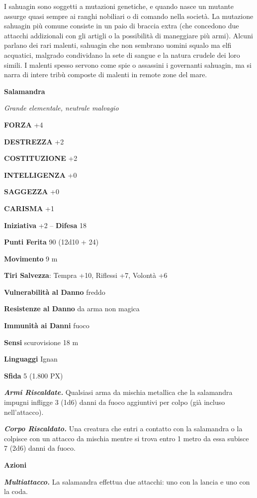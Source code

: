 \begin{multicols}{2}
I sahuagin sono soggetti a mutazioni genetiche, e quando nasce un mutante assurge quasi sempre ai ranghi nobiliari o di comando nella società. La mutazione sahuagin più comune consiste in un paio di braccia extra (che concedono due attacchi addizionali con gli artigli o la possibilità di maneggiare più armi). Alcuni parlano dei rari malenti, sahuagin che non sembrano uomini squalo ma elfi acquatici, malgrado condividano la sete di sangue e la natura crudele dei loro simili. I malenti spesso servono come spie o assassini i governanti sahuagin, ma si narra di intere tribù composte di malenti in remote zone del mare.


\medskip{}\textbf{Salamandra}

\textit{Grande elementale, neutrale malvagio}

\textbf{FORZA} +4

\textbf{DESTREZZA} +2

\textbf{COSTITUZIONE} +2

\textbf{INTELLIGENZA} +0

\textbf{SAGGEZZA} +0

\textbf{CARISMA} +1

\textbf{Iniziativa} +2 -- \textbf{Difesa} 18

\textbf{Punti Ferita} 90 (12d10 + 24)

\textbf{Movimento} 9 m

\textbf{Tiri Salvezza}: Tempra +10, Riflessi +7, Volontà +6

\textbf{Vulnerabilità al Danno} freddo

\textbf{Resistenze al Danno} da arma non magica

\textbf{Immunità ai Danni} fuoco

\textbf{Sensi} scurovisione 18 m

\textbf{Linguaggi} Ignan

\textbf{Sfida} 5 (1.800 PX)

\textit{\textbf{Armi Riscaldate.}} Qualsiasi arma da mischia metallica che la salamandra impugni infligge 3 (1d6) danni da fuoco aggiuntivi per colpo (già incluso nell'attacco).

\textit{\textbf{Corpo Riscaldato.}} Una creatura che entri a contatto con la salamandra o la colpisce con un attacco da mischia mentre si trova entro 1 metro da essa subisce 7 (2d6) danni da fuoco.

\textbf{Azioni}

\textit{\textbf{Multiattacco.}} La salamandra effettua due attacchi: uno con la lancia e uno con la coda.


\end{multicols}
